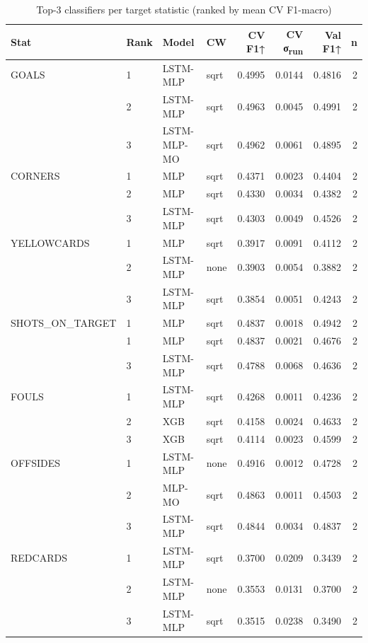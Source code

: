 \begin{table}[htbp]
\centering
\caption{Top-3 classifiers per target statistic (ranked by mean CV F1-macro)}
\label{tab:clf_leaderboard}
\small
\begin{tabular}{llllrrrr}
\toprule
\textbf{Stat} & \textbf{Rank} & \textbf{Model} & \textbf{CW} & \textbf{CV F1↑} & \textbf{CV σ\textsubscript{run}} & \textbf{Val F1↑} & \textbf{n} \\
\midrule
GOALS & 1 & LSTM-MLP & sqrt & 0.4995 & 0.0144 & 0.4816 & 2 \\
 & 2 & LSTM-MLP & sqrt & 0.4963 & 0.0045 & 0.4991 & 2 \\
 & 3 & LSTM-MLP-MO & sqrt & 0.4962 & 0.0061 & 0.4895 & 2 \\
\midrule
CORNERS & 1 & MLP & sqrt & 0.4371 & 0.0023 & 0.4404 & 2 \\
 & 2 & MLP & sqrt & 0.4330 & 0.0034 & 0.4382 & 2 \\
 & 3 & LSTM-MLP & sqrt & 0.4303 & 0.0049 & 0.4526 & 2 \\
\midrule
YELLOWCARDS & 1 & MLP & sqrt & 0.3917 & 0.0091 & 0.4112 & 2 \\
 & 2 & LSTM-MLP & none & 0.3903 & 0.0054 & 0.3882 & 2 \\
 & 3 & LSTM-MLP & sqrt & 0.3854 & 0.0051 & 0.4243 & 2 \\
\midrule
SHOTS_ON_TARGET & 1 & MLP & sqrt & 0.4837 & 0.0018 & 0.4942 & 2 \\
 & 1 & MLP & sqrt & 0.4837 & 0.0021 & 0.4676 & 2 \\
 & 3 & LSTM-MLP & sqrt & 0.4788 & 0.0068 & 0.4636 & 2 \\
\midrule
FOULS & 1 & LSTM-MLP & sqrt & 0.4268 & 0.0011 & 0.4236 & 2 \\
 & 2 & XGB & sqrt & 0.4158 & 0.0024 & 0.4633 & 2 \\
 & 3 & XGB & sqrt & 0.4114 & 0.0023 & 0.4599 & 2 \\
\midrule
OFFSIDES & 1 & LSTM-MLP & none & 0.4916 & 0.0012 & 0.4728 & 2 \\
 & 2 & MLP-MO & sqrt & 0.4863 & 0.0011 & 0.4503 & 2 \\
 & 3 & LSTM-MLP & sqrt & 0.4844 & 0.0034 & 0.4837 & 2 \\
\midrule
REDCARDS & 1 & LSTM-MLP & sqrt & 0.3700 & 0.0209 & 0.3439 & 2 \\
 & 2 & LSTM-MLP & none & 0.3553 & 0.0131 & 0.3700 & 2 \\
 & 3 & LSTM-MLP & sqrt & 0.3515 & 0.0238 & 0.3490 & 2 \\
\bottomrule
\end{tabular}
\end{table}